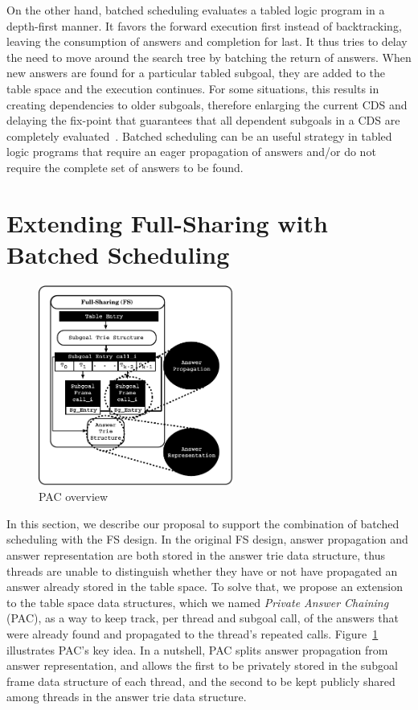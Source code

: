 \documentclass{llncs}
\begin{document}
On the other hand, batched scheduling evaluates a tabled logic program
in a depth-first manner. It favors the forward execution first instead
of backtracking, leaving the consumption of answers and completion for
last. It thus tries to delay the need to move around the search tree
by batching the return of answers. When new answers are found for a
particular tabled subgoal, they are added to the table space and the
execution continues. For some situations, this results in creating
dependencies to older subgoals, therefore enlarging the current CDS
and delaying the fix-point that guarantees that all dependent subgoals
in a CDS are completely evaluated~\cite{Sagonas-98}. Batched
scheduling can be an useful strategy in tabled logic programs that
require an eager propagation of answers and/or do not require the
complete set of answers to be found.


\section{Extending Full-Sharing with Batched Scheduling}

\begin{figure}
\vspace{-\intextsep}
\centering
\includegraphics[width=6.4cm]{figures/pac_overview.pdf}
\caption{PAC overview}
\label{fig_pac_overview}
\vspace{-\intextsep}
\end{figure}

In this section, we describe our proposal to support the combination
of batched scheduling with the FS design. In the original FS design,
answer propagation and answer representation are both stored in the
answer trie data structure, thus threads are unable to distinguish
whether they have or not have propagated an answer already stored in
the table space. To solve that, we propose an extension to the table
space data structures, which we named \emph{Private Answer Chaining}
(PAC), as a way to keep track, per thread and subgoal call, of the
answers that were already found and propagated to the thread's
repeated calls. Figure~\ref{fig_pac_overview} illustrates PAC's key
idea. In a nutshell, PAC splits answer propagation from answer
representation, and allows the first to be privately stored in the
subgoal frame data structure of each thread, and the second to be kept
publicly shared among threads in the answer trie data structure.
\end{document}
